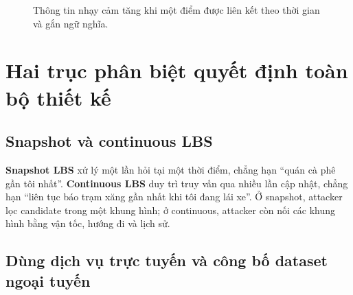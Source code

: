 \documentclass[11pt,a4paper,oneside]{report}
\begin{document}
\begin{figure}[htbp]
\centering
{}
\caption{Thông tin nhạy cảm tăng khi một điểm được liên kết theo thời gian và gắn ngữ nghĩa.}
\label{fig:data-evolution}
\end{figure}

\section{Hai trục phân biệt quyết định toàn bộ thiết kế}

\subsection{Snapshot và continuous LBS}

\textbf{Snapshot LBS} xử lý một lần hỏi tại một thời điểm, chẳng hạn ``quán cà phê
gần tôi nhất''. \textbf{Continuous LBS} duy trì truy vấn qua nhiều lần cập nhật,
chẳng hạn ``liên tục báo trạm xăng gần nhất khi tôi đang lái xe''. Ở snapshot,
attacker lọc candidate trong một khung hình; ở continuous, attacker còn nối các
khung hình bằng vận tốc, hướng đi và lịch sử.

\subsection{Dùng dịch vụ trực tuyến và công bố dataset ngoại tuyến}
\end{document}
